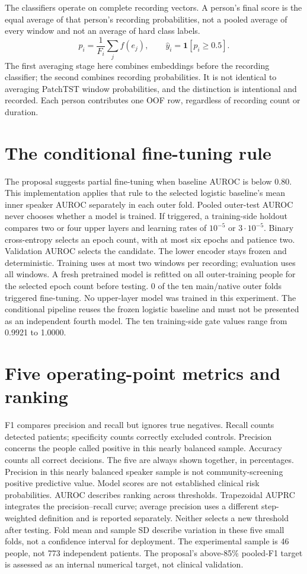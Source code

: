 \documentclass[11pt,a4paper]{article}
\begin{document}
The classifiers operate on complete recording vectors. A person's final score is
the equal average of that person's recording probabilities, not a pooled average
of every window and not an average of hard class labels.
\[
p_i=\frac{1}{F_i}\sum_j f(e_j),\qquad \hat y_i=\mathbf 1[p_i\geq0.5].
\]
The first averaging stage here combines embeddings before the recording classifier;
the second combines recording probabilities. It is not identical to averaging
PatchTST window probabilities, and the distinction is intentional and recorded.
Each person contributes one OOF row, regardless of recording count or duration.
\clearpage\section{The conditional fine-tuning rule}
The proposal suggests partial fine-tuning when baseline AUROC is below 0.80.
This implementation applies that rule to the selected logistic baseline's mean
inner speaker AUROC separately in each outer fold. Pooled outer-test AUROC never
chooses whether a model is trained.
If triggered, a training-side holdout compares two or four upper layers and learning
rates of $10^{-5}$ or $3\cdot10^{-5}$. Binary cross-entropy selects an epoch count,
with at most six epochs and patience two. Validation AUROC selects the candidate.
The lower encoder stays frozen and deterministic. Training uses at most two windows
per recording; evaluation uses all windows. A fresh pretrained model is refitted
on all outer-training people for the selected epoch count before testing.
0 of the ten main/native outer folds triggered fine-tuning. No upper-layer model was trained in this experiment. The conditional pipeline reuses the frozen logistic baseline and must not be presented as an independent fourth model. The ten training-side gate values range from 0.9921 to 1.0000.
\clearpage\section{Five operating-point metrics and ranking}
F1 compares precision and recall but ignores true negatives. Recall counts detected
patients; specificity counts correctly excluded controls. Precision concerns the
people called positive in this nearly balanced sample. Accuracy counts all correct
decisions. The five are always shown together, in percentages.
Precision in this nearly balanced speaker sample is not community-screening
positive predictive value. Model scores are not established clinical risk probabilities.
AUROC describes ranking across thresholds. Trapezoidal AUPRC integrates the
precision--recall curve; average precision uses a different step-weighted definition
and is reported separately. Neither selects a new threshold after testing.
Fold mean and sample SD describe variation in these five small folds, not a
confidence interval for deployment. The experimental sample is 46 people,
not 773 independent patients. The proposal's above-85\% pooled-F1 target is
assessed as an internal numerical target, not clinical validation.
\end{document}
